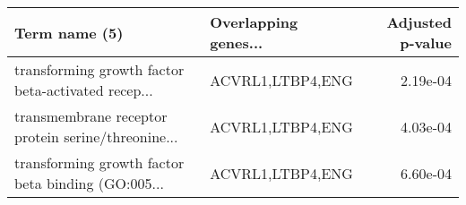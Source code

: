 \begin{tabular}{llr}
\toprule
                                     Term name (5) & Overlapping genes... &  Adjusted p-value \\
\midrule
transforming growth factor beta-activated recep... &     ACVRL1,LTBP4,ENG &          2.19e-04 \\
transmembrane receptor protein serine/threonine... &     ACVRL1,LTBP4,ENG &          4.03e-04 \\
transforming growth factor beta binding (GO:005... &     ACVRL1,LTBP4,ENG &          6.60e-04 \\
\bottomrule
\end{tabular}
